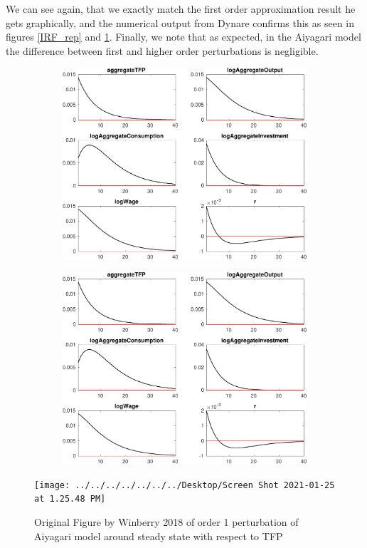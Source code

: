 \documentclass[11pt]{article}
\begin{document}
We can see again, that we exactly match the first order approximation result he gets graphically, and the numerical output from Dynare confirms this as seen in  figures \ref{IRF_rep} and \ref{IRF_orig}. Finally, we note that as expected, in the Aiyagari model the difference between first and higher order perturbations is negligible. 
\begin{figure}[htp]
\begin{subfigure}{.5\textwidth}
\centering	
\includegraphics[scale=.33]{../Figures/dynamics_polynomials_IRF_aggregateTFPShock.pdf}
\end{subfigure}
\begin{subfigure}{.5\textwidth}
\centering
\includegraphics[scale=.355]{../Figures/dynamics_polynomials_IRF_aggregateTFPShock_second_order.pdf}
\end{subfigure}
\caption{Replicated impulse response functions around Python computed steady state of Order 1 and Order 2 (from left to right).}
\label{IRF_rep}
\vspace*{\floatsep}
\centering
\texttt{[image: ../../../../../../../Desktop/Screen Shot 2021-01-25 at 1.25.48 PM]}
\caption{Original Figure by Winberry 2018 of order 1 perturbation of Aiyagari model around steady state with respect to TFP}
\label{IRF_orig}
\end{figure}
\end{document}
